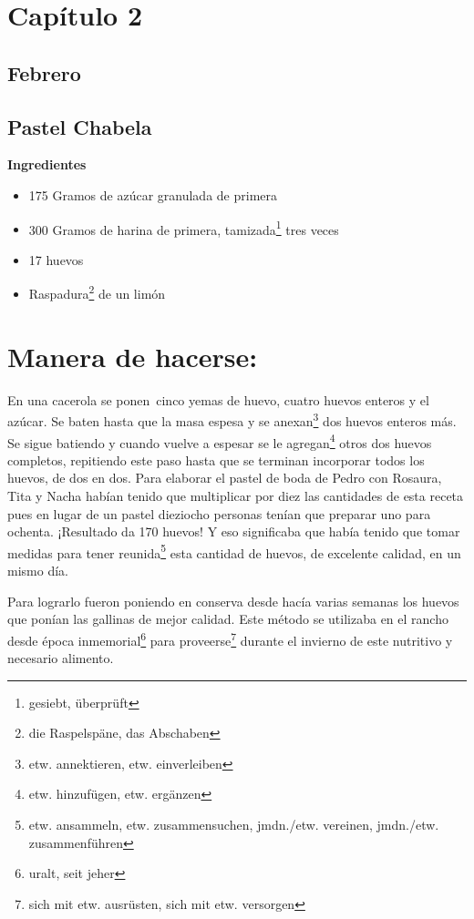 \clearpage

\section*{ Capítulo 2 }
\subsection*{ Febrero }
\subsection*{ Pastel Chabela }
\textbf{Ingredientes}

\begin{itemize}
\item 175 Gramos de azúcar granulada de primera
\item 300 Gramos de harina de primera, tamizada\footnote{gesiebt, überprüft} tres veces
\item 17 huevos
\item Raspadura\footnote{die Raspelspäne, das Abschaben} de un limón
\end{itemize}

\section*{ Manera de hacerse:}
En una cacerola se ponen~cinco yemas de huevo, cuatro huevos enteros y
el azúcar. Se baten hasta que la masa espesa y se anexan\footnote{etw. annektieren, etw. einverleiben} dos huevos
enteros más. Se sigue batiendo y cuando vuelve a espesar se le agregan\footnote{etw. hinzufügen, etw. ergänzen} otros dos
huevos completos, repitiendo este paso hasta que se terminan
incorporar todos los huevos, de dos en dos. Para elaborar el pastel de
boda de Pedro con Rosaura, Tita y Nacha habían tenido que multiplicar
por diez las cantidades de esta receta pues en lugar de un pastel dieziocho
personas tenían que preparar uno para ochenta. ¡Resultado da 170 huevos! Y eso
significaba que había tenido que tomar medidas para tener reunida\footnote{etw. ansammeln, etw. zusammensuchen,  jmdn./etw. vereinen, jmdn./etw. zusammenführen} esta
cantidad de huevos, de excelente calidad, en un mismo día.

Para lograrlo fueron poniendo en conserva desde hacía varias semanas
los huevos que ponían las gallinas de mejor calidad. Este método se
utilizaba en el rancho desde época inmemorial\footnote{uralt, seit jeher}
para proveerse\footnote{sich mit etw. ausrüsten, sich mit etw. versorgen}
durante el invierno de este nutritivo y necesario alimento.

